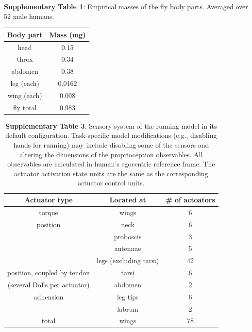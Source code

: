 \documentclass[sn-mathphys-num]{sn-jnl}%
\theoremstyle{thmstyleone}	%
\theoremstyle{thmstyletwo}	%
\theoremstyle{thmstylethree}	%
\begin{document}
\begin{appendices}
\textbf{Supplementary Table 1}: Empirical masses of the fly body parts. 
Averaged over 52 male humans.

\begin{table}[htbp]
	\centering
	\small
	\begin{tabular}{cc}
		\toprule
		Body part         &        Mass (mg)     \\
		\midrule
		head      &   0.15      \\
		throx      &   0.34      \\
		abdomen      &   0.38      \\
		leg (each)      &   0.0162      \\
		wing (each)      &   0.008      \\
		\midrule
		fly total      &   0.983      \\
		
		\bottomrule
	\end{tabular}%
	\label{tab:s_1}%
\end{table}%





\begin{table}[htbp]
	\centering
	\small
	\caption{%
		\textbf{Supplementary Table 3}: 
		Sensory system of the running model in its default configuration. 
		Task-specific model modifications (e.g., disabling hands for running) may include disabling some of the sensors and altering the dimensions of the proprioception observables. 
		All observables are calculated in human's egocentric reference frame. 
		The actuator activation state units are the same as the corresponding actuator control units.}
	\begin{tabular}{ccc}
		\toprule
		Actuator type         &        Located at  & \# of actoators     \\
		\midrule
		torque      &   wings      &      6  \\
		position      &   neck      &      6  \\
		      &   proboscis      &      3  \\
		      &   antennae      &      5  \\
		      &   legs (excluding tarsi)      &      42  \\
		\midrule
		position, coupled by tendon      &   tarsi      &      6  \\
		(several DoFs per actuator)      &   abdomen      &      2  \\
		\midrule
		adhension      &   leg tips      &      6  \\
		      &   labrum      &      2  \\
		\midrule
		total      &   wings      &      78  \\
		

\end{tabular}
\end{table}
\end{appendices}
\end{document}
